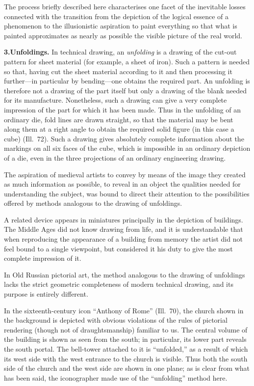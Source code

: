 The process briefly described here characterises one facet of the inevitable losses
connected with the transition from the depiction of the logical essence of a phenomenon
to the illusionistic aspiration to paint everything so that what is painted approximates
as nearly as possible the visible picture of the real world.

\noindent\textbf{3.}\quad\textbf{Unfoldings.}
In technical drawing, an \emph{unfolding} is a drawing of the cut-out pattern for sheet
material (for example, a sheet of iron).  Such a pattern is needed so that, having cut
the sheet material according to it and then processing it further---in particular by
bending---one obtains the required part.  An unfolding is therefore not a drawing of the
part itself but only a drawing of the blank needed for its manufacture.  Nonetheless,
such a drawing can give a very complete impression of the part for which it has been made.
Thus in the unfolding of an ordinary die, fold lines are drawn straight, so that the
material may be bent along them at a right angle to obtain the required solid figure (in
this case a cube) (Ill.~72).  Such a drawing gives absolutely complete information about
the markings on all six faces of the cube, which is impossible in an ordinary depiction
of a die, even in the three projections of an ordinary engineering drawing.

The aspiration of medieval artists to convey by means of the image they created as much
information as possible, to reveal in an object the qualities needed for understanding
the subject, was bound to direct their attention to the possibilities offered by methods
analogous to the drawing of unfoldings.


A related device appears in miniatures principally in the depiction of buildings.  The
Middle Ages did not know drawing from life, and it is understandable that when reproducing
the appearance of a building from memory the artist did not feel bound to a single
viewpoint, but considered it his duty to give the most complete impression of it.


In Old Russian pictorial art, the method analogous to the drawing of unfoldings lacks
the strict geometric completeness of modern technical drawing, and its purpose is entirely
different.

In the sixteenth-century icon ``Anthony of Rome'' (Ill.~70), the church shown in the
background is depicted with obvious violations of the rules of pictorial rendering (though
not of draughtsmanship) familiar to us.  The central volume of the building is shown as
seen from the south; in particular, its lower part reveals the south portal.  The
bell-tower attached to it is ``unfolded,'' as a result of which its west side with the
west entrance to the church is visible.  Thus both the south side of the church and the
west side are shown in one plane; as is clear from what has been said, the iconographer
made use of the ``unfolding'' method here.

